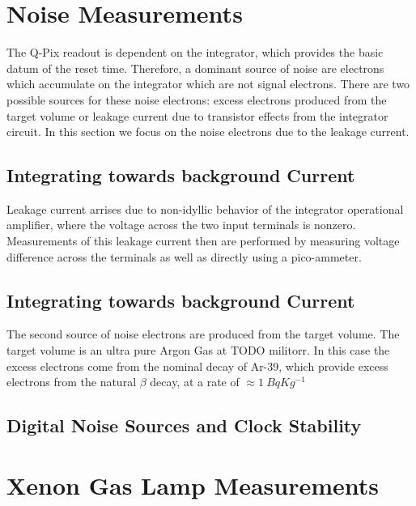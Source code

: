 \section{Noise Measurements}

The Q-Pix readout is dependent on the integrator, which provides the basic datum of the reset time.
Therefore, a dominant source of noise are electrons which accumulate on the integrator which are not signal electrons.
There are two possible sources for these noise electrons: excess electrons produced from the target volume or leakage current due to transistor effects from the integrator circuit.
In this section we focus on the noise electrons due to the leakage current.

\subsection{Integrating towards background Current}

Leakage current arrises due to non-idyllic behavior of the integrator operational amplifier, where the voltage across the two input terminals is nonzero.
Measurements of this leakage current then are performed by measuring voltage difference across the terminals as well as directly using a pico-ammeter.

\subsection{Integrating towards background Current}

The second source of noise electrons are produced from the target volume.
The target volume is an ultra pure Argon Gas at TODO militorr.
In this case the excess electrons come from the nominal decay of Ar-39, which provide excess electrons from the natural $\beta$ decay, at a rate of $\approx 1~\unit{Bq}{Kg^{-1}}$

\subsection{Digital Noise Sources and Clock Stability}


\section{Xenon Gas Lamp Measurements}

